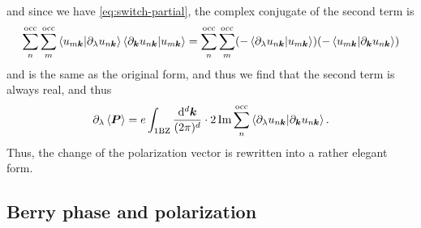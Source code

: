 \documentclass[hyperref, a4paper]{article}
\begin{document}
and since we have \eqref{eq:switch-partial}, the complex conjugate of the second term is 
\[
    \sum_{n}^{\text{occ}} \sum_{m}^{\text{occ}}
    \braket{u_{m \vb*{k}}}{\partial_{\lambda} u_{n \vb*{k}}}
    \braket{\partial_{\vb*{k}} u_{n \vb*{k}}}{u_{m \vb*{k}}}
    = \sum_{n}^{\text{occ}} \sum_{m}^{\text{occ}}
    (- \braket{\partial_{\lambda} u_{n \vb*{k}}}{u_{m \vb*{k}}})
    (- \braket{u_{m \vb*{k}}}{\partial_{\vb*{k}} u_{n \vb*{k}}})
\]
and is the same as the original form, 
and thus we find that the second term is always real, 
and thus 
\begin{equation}
    \partial_{\lambda} \expval{\vb*{P}} = e \int_{\text{1BZ}} \frac{\dd[d]{\vb*{k}}}{(2\pi)^d} 
    \cdot 2 \Im \sum_{n}^{\text{occ}} 
    \braket{\partial_\lambda u_{n \vb*{k}}}{\partial_{\vb*{k}} u_{n \vb*{k}}}.
    \label{eq:change-of-p-3}
\end{equation}
Thus, the change of the polarization vector 
is rewritten into a rather elegant form.

\subsection{Berry phase and polarization}
\end{document}
